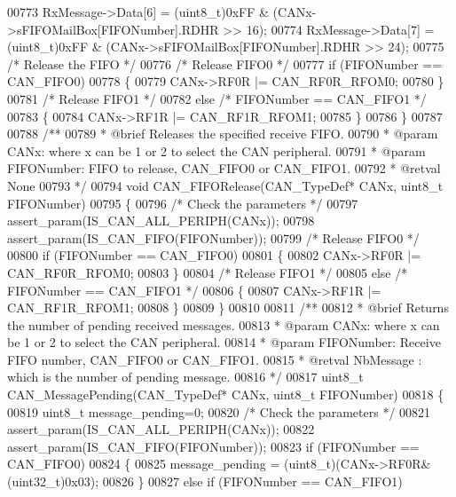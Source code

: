 \begin{DoxyCode}
00773   RxMessage->Data[6] = (uint8\_t)0xFF & (CANx->sFIFOMailBox[FIFONumber].RDHR >> 16);
00774   RxMessage->Data[7] = (uint8\_t)0xFF & (CANx->sFIFOMailBox[FIFONumber].RDHR >> 24);
00775   \textcolor{comment}{/* Release the FIFO */}
00776   \textcolor{comment}{/* Release FIFO0 */}
00777   \textcolor{keywordflow}{if} (FIFONumber == CAN_FIFO0)
00778   \{
00779     CANx->RF0R |= CAN_RF0R_RFOM0;
00780   \}
00781   \textcolor{comment}{/* Release FIFO1 */}
00782   \textcolor{keywordflow}{else} \textcolor{comment}{/* FIFONumber == CAN\_FIFO1 */}
00783   \{
00784     CANx->RF1R |= CAN_RF1R_RFOM1;
00785   \}
00786 \}
00787 
00788 \textcolor{comment}{/**}
00789 \textcolor{comment}{  * @brief  Releases the specified receive FIFO.}
00790 \textcolor{comment}{  * @param  CANx: where x can be 1 or 2 to select the CAN peripheral.}
00791 \textcolor{comment}{  * @param  FIFONumber: FIFO to release, CAN\_FIFO0 or CAN\_FIFO1.}
00792 \textcolor{comment}{  * @retval None}
00793 \textcolor{comment}{  */}
00794 \textcolor{keywordtype}{void} CAN_FIFORelease(CAN\_TypeDef* CANx, uint8\_t FIFONumber)
00795 \{
00796   \textcolor{comment}{/* Check the parameters */}
00797   assert_param(IS\_CAN\_ALL\_PERIPH(CANx));
00798   assert_param(IS\_CAN\_FIFO(FIFONumber));
00799   \textcolor{comment}{/* Release FIFO0 */}
00800   \textcolor{keywordflow}{if} (FIFONumber == CAN_FIFO0)
00801   \{
00802     CANx->RF0R |= CAN_RF0R_RFOM0;
00803   \}
00804   \textcolor{comment}{/* Release FIFO1 */}
00805   \textcolor{keywordflow}{else} \textcolor{comment}{/* FIFONumber == CAN\_FIFO1 */}
00806   \{
00807     CANx->RF1R |= CAN_RF1R_RFOM1;
00808   \}
00809 \}
00810 
00811 \textcolor{comment}{/**}
00812 \textcolor{comment}{  * @brief  Returns the number of pending received messages.}
00813 \textcolor{comment}{  * @param  CANx: where x can be 1 or 2 to select the CAN peripheral.}
00814 \textcolor{comment}{  * @param  FIFONumber: Receive FIFO number, CAN\_FIFO0 or CAN\_FIFO1.}
00815 \textcolor{comment}{  * @retval NbMessage : which is the number of pending message.}
00816 \textcolor{comment}{  */}
00817 uint8\_t CAN_MessagePending(CAN\_TypeDef* CANx, uint8\_t FIFONumber)
00818 \{
00819   uint8\_t message\_pending=0;
00820   \textcolor{comment}{/* Check the parameters */}
00821   assert_param(IS\_CAN\_ALL\_PERIPH(CANx));
00822   assert_param(IS\_CAN\_FIFO(FIFONumber));
00823   \textcolor{keywordflow}{if} (FIFONumber == CAN_FIFO0)
00824   \{
00825     message\_pending = (uint8\_t)(CANx->RF0R&(uint32\_t)0x03);
00826   \}
00827   \textcolor{keywordflow}{else} \textcolor{keywordflow}{if} (FIFONumber == CAN_FIFO1)

\end{DoxyCode}
